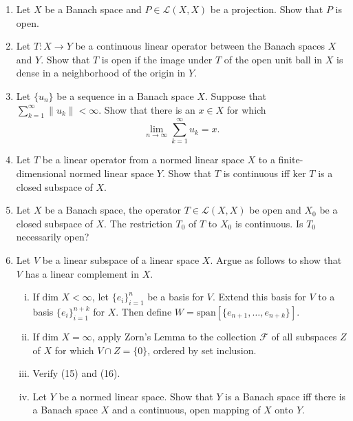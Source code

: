 \begin{enumerate}
    \item Let $X$ be a Banach space and $P\in\mathcal{L}(X,X)$ be a projection.
    Show that $P$ is open.
    \item Let $T:X\to Y$ be a continuous linear operator between the Banach spaces $X$ and $Y$.
    Show that $T$ is open if the image under $T$ of the open unit ball in $X$ is dense in a neighborhood of the origin in $Y$.
    \item Let $\{u_n\}$ be a sequence in a Banach space $X$.
    Suppose that $\sum_{k=1}^\infty\|u_k\|<\infty$.
    Show that there is an $x\in X$ for which
    \[
        \lim_{n\to\infty}\sum_{k=1}^\infty u_k=x.
    \]
    \item Let $T$ be a linear operator from a normed linear space $X$ to a finite-dimensional normed linear space $Y$.
    Show that $T$ is continuous iff $\text{ker }T$ is a closed subspace of $X$.
    \item Let $X$ be a Banach space, the operator $T\in\mathcal{L}(X,X)$ be open and $X_0$ be a closed subspace of $X$.
    The restriction $T_0$ of $T$ to $X_0$ is continuous.
    Is $T_0$ necessarily open?
    \item Let $V$ be a linear subspace of a linear space $X$.
    Argue as follows to show that $V$ has a linear complement in $X$.
    \begin{enumerate}[(i)]
        \item If $\text{dim }X<\infty$, let $\{e_i\}_{i=1}^n$ be a basis for $V$.
        Extend this basis for $V$ to a basis $\{e_i\}_{i=1}^{n+k}$ for $X$.
        Then define $W=\text{span}[\{e_{n+1},\dots,e_{n+k}\}]$.
        \item If $\text{dim }X=\infty$, apply Zorn's Lemma to the collection $\mathcal{F}$ of all subspaces $Z$ of $X$ for which $V\cap Z=\{0\}$, ordered by set inclusion.
        \item Verify (15) and (16).
        \item Let $Y$ be a normed linear space.
        Show that $Y$ is a Banach space iff there is a Banach space $X$ and a continuous, open mapping of $X$ onto $Y$.
    \end{enumerate}
\end{enumerate}

